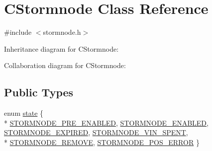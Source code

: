 \hypertarget{class_c_stormnode}{}\section{C\+Stormnode Class Reference}
\label{class_c_stormnode}


{\ttfamily \#include $<$stormnode.\+h$>$}



Inheritance diagram for C\+Stormnode\+:


Collaboration diagram for C\+Stormnode\+:
\subsection*{Public Types}
\begin{DoxyCompactItemize}
\item 
enum \hyperlink{class_c_stormnode_a8c9a83b0ce70988102d71ecfabe99aa0}{state} \{ \\*
\hyperlink{class_c_stormnode_a8c9a83b0ce70988102d71ecfabe99aa0a4d96c08f8f4c62ae9e43b0d82db5e2f1}{S\+T\+O\+R\+M\+N\+O\+D\+E\+\_\+\+P\+R\+E\+\_\+\+E\+N\+A\+B\+L\+E\+D}, 
\hyperlink{class_c_stormnode_a8c9a83b0ce70988102d71ecfabe99aa0a4af8128443469b549a0c4d6cf59a3a79}{S\+T\+O\+R\+M\+N\+O\+D\+E\+\_\+\+E\+N\+A\+B\+L\+E\+D}, 
\hyperlink{class_c_stormnode_a8c9a83b0ce70988102d71ecfabe99aa0ab3e35c4e3e07236ee4bdd2fc0cc11f99}{S\+T\+O\+R\+M\+N\+O\+D\+E\+\_\+\+E\+X\+P\+I\+R\+E\+D}, 
\hyperlink{class_c_stormnode_a8c9a83b0ce70988102d71ecfabe99aa0abe760cfa737f943c06d449afc2b03f1d}{S\+T\+O\+R\+M\+N\+O\+D\+E\+\_\+\+V\+I\+N\+\_\+\+S\+P\+E\+N\+T}, 
\\*
\hyperlink{class_c_stormnode_a8c9a83b0ce70988102d71ecfabe99aa0a89fa3f4b7441a2d2add5334396a88b06}{S\+T\+O\+R\+M\+N\+O\+D\+E\+\_\+\+R\+E\+M\+O\+V\+E}, 
\hyperlink{class_c_stormnode_a8c9a83b0ce70988102d71ecfabe99aa0a61dac974c55abf841bb617fa4beba96e}{S\+T\+O\+R\+M\+N\+O\+D\+E\+\_\+\+P\+O\+S\+\_\+\+E\+R\+R\+O\+R}
 \}
\end{DoxyCompactItemize}
